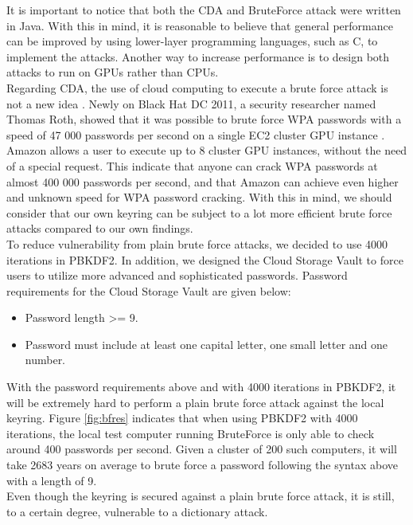 \documentclass[pdftex,english,10pt,b5paper,twoside]{book}
\begin{document}
\noindent It is important to notice that both the CDA and BruteForce
attack were written in Java. With this in mind, it is reasonable to believe
that general performance can be improved by using lower-layer
programming languages, such as C, to implement the attacks. Another way to
increase performance is to design both attacks to run on \ac{GPU}s rather than CPUs.\\

\noindent Regarding CDA, the use of cloud computing to execute a brute force
attack is not a new idea \cite{bfpgp, rothsha, rothwpa}. Newly on Black Hat DC 2011, a
security researcher named Thomas Roth, showed that it was possible to brute
force WPA passwords with a speed of 47 000 passwords per second on a single EC2
cluster GPU instance \cite{rothwpa}. Amazon allows a user to execute up to 8
cluster GPU instances, without the need of a special request. This indicate that
anyone can crack WPA passwords at almost 400 000 passwords per second, and that
Amazon can achieve even higher and unknown speed for WPA password cracking. With
this in mind, we should consider that our own keyring can be subject to a lot
more efficient brute force attacks compared to our own findings.\\

\noindent To reduce vulnerability from plain brute force attacks, we decided to
use 4000 iterations in PBKDF2. In addition, we designed the Cloud Storage Vault
to force users to utilize more advanced and sophisticated passwords. Password
requirements for the Cloud Storage Vault are given below:

\begin{itemize}
\item Password length >= 9.
\item Password must include at least one capital letter, one small letter and
one number.
\end{itemize}

\noindent With the password requirements above and with 4000 iterations in PBKDF2, it will
be extremely hard to perform a plain brute force attack against the local
keyring. Figure \ref{fig:bfres} indicates that when using PBKDF2 with 4000
iterations, the local test computer running BruteForce is only able to check
around 400 passwords per second. Given a cluster of 200 such computers, it will
take 2683 years on average to brute force a password following the syntax above
with a length of 9.\\

\noindent Even though the keyring is secured against a plain brute force attack, it is
still, to a certain degree,  vulnerable to a dictionary attack.
\end{document}
